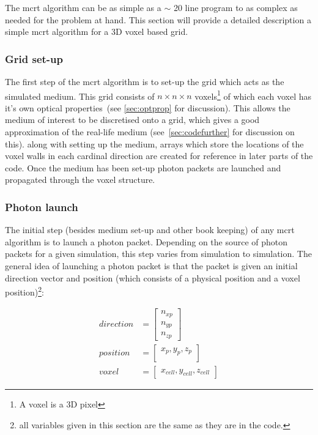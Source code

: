 The \gls{mcrt} algorithm can be as simple as a $\sim$ 20 line program to as complex as needed for the problem at hand. This section will provide a detailed description a simple \gls{mcrt} algorithm for a 3D voxel based grid.

\subsubsection{Grid set-up}\label{sec:photsetup}

The first step of the \gls{mcrt} algorithm is to set-up the grid which acts as the simulated medium. This grid consists of $n \times n \times n$ voxels\footnote{A voxel is a 3D pixel} of which each voxel has it's own optical properties~(see \cref{sec:optprop} for discussion). This allows the medium of interest to be discretised onto a grid, which gives a good approximation of the real-life medium (see~\cref{sec:codefurther} for discussion on this). along with setting up the medium, arrays which store the locations of the voxel walls in each cardinal direction are created for reference in later parts of the code. Once the medium has been set-up photon packets are launched and propagated through the voxel structure.



\subsubsection{Photon launch}\label{sec:photlaunch}

The initial step (besides medium set-up and other book keeping) of any \gls{mcrt} algorithm is to launch a photon packet. Depending on the source of photon packets for a given simulation, this step varies from simulation to simulation. The general idea of launching a photon packet is that the packet is given an initial direction vector and position (which consists of a physical position and a voxel position)\footnote{all variables given in this section are the same as they are in the code.}:

\begin{align}
	direction &= \begin{bmatrix}
		n_{xp}\\
		n_{yp}\\
		n_{zp}
	\end{bmatrix}\\
	position &= \begin{bmatrix}
		x_p, y_p, z_p\\
	\end{bmatrix}\\
	voxel &= \begin{bmatrix}
		x_{cell}, y_{cell}, z_{cell}
	\end{bmatrix}	 
\end{align}

